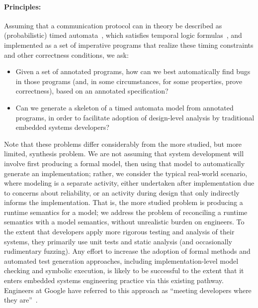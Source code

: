 \paragraph{Principles:} Assuming that a communication protocol can in theory be described
as (probabilistic) timed automata~\cite{AD1994:TCS},
which satisfies temporal logic
formulas~\cite{BLM2017:LNCS}, and implemented as a set of
imperative programs that realize these timing constraints and other
correctness conditions, we ask:
\begin{itemize}[labelsep=3pt,leftmargin=12pt]
\item Given a set of annotated programs, how can we best automatically
  find bugs in those programs (and, in some circumstances, for some
  properties, prove correctness), based on an annotated
  specification?
\item Can we generate a skeleton of a timed automata model from 
  annotated programs, in order to facilitate adoption of design-level analysis by 
  traditional embedded systems developers? 
\end{itemize}

Note that these problems differ considerably from the more studied,
but more limited, synthesis problem.  We are not assuming that
system development will involve first producing a formal model, then
using that model to automatically generate an implementation; rather,
we consider the typical real-world scenario, where modeling is a
separate activity, either undertaken after implementation due to
concerns about reliability, or an activity during design that only
indirectly informs the implementation.  That is, the more studied
problem is producing a runtime semantics for a model; we address the
problem of reconciling a runtime semantics with a model semantics,
without unrealistic burden on engineers.  To the extent that developers apply more rigorous
testing and analysis of their systems, they primarily use unit tests
and static analysis (and occasionally rudimentary  fuzzing).  Any
effort to increase the
adoption of formal methods and automated test generation
approaches, including implementation-level model checking and symbolic
execution, is likely to be successful to the extent that it enters
embedded systems engineering practice via this existing pathway.  Engineers at Google have referred to this
approach as ``meeting developers where they are''~\cite{meeting}.


